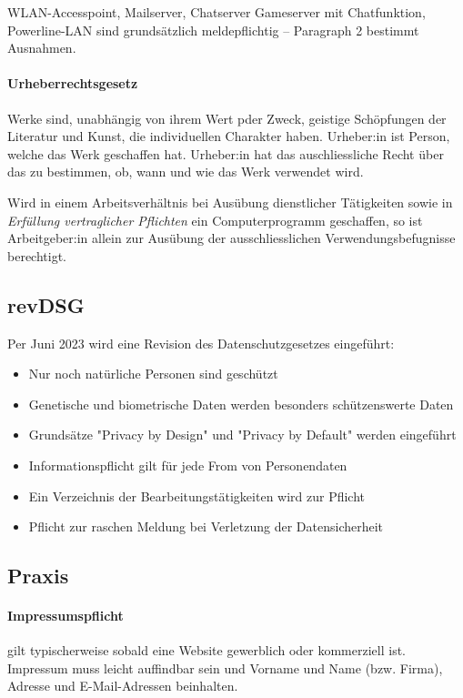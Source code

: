 \documentclass[a4paper,12pt]{article}
\begin{document}
WLAN-Accesspoint, Mailserver, Chatserver Gameserver mit Chatfunktion, Powerline-LAN sind grundsätzlich meldepflichtig -- Paragraph 2 bestimmt Ausnahmen.

\paragraph{Urheberrechtsgesetz} Werke sind, unabhängig von ihrem Wert pder Zweck, geistige Schöpfungen der Literatur und Kunst, die individuellen Charakter haben. Urheber:in ist Person, welche das Werk geschaffen hat. Urheber:in hat das auschliessliche Recht über das zu bestimmen, ob, wann und wie das Werk verwendet wird.

Wird in einem Arbeitsverhältnis bei Ausübung dienstlicher Tätigkeiten sowie in \emph{Erfüllung vertraglicher Pflichten} ein Computerprogramm geschaffen, so ist Arbeitgeber:in allein zur Ausübung der ausschliesslichen Verwendungsbefugnisse berechtigt.

\subsection{revDSG}
Per Juni 2023 wird eine Revision des Datenschutzgesetzes eingeführt:
\begin{itemize}
\item Nur noch natürliche Personen sind geschützt
\item Genetische und biometrische Daten werden besonders schützenswerte Daten
\item Grundsätze "Privacy by Design" und "Privacy by Default" werden eingeführt
\item Informationspflicht gilt für jede From von Personendaten
\item Ein Verzeichnis der Bearbeitungstätigkeiten wird zur Pflicht
\item Pflicht zur raschen Meldung bei Verletzung der Datensicherheit
\end{itemize}

\subsection{Praxis}

\paragraph{Impressumspflicht} gilt typischerweise sobald eine Website gewerblich oder kommerziell ist. Impressum muss leicht auffindbar sein und Vorname und Name (bzw. Firma), Adresse und E-Mail-Adressen beinhalten.
\end{document}
